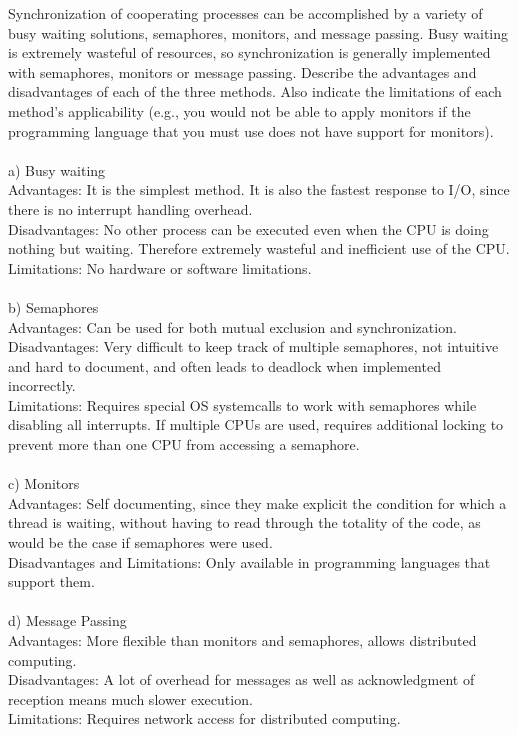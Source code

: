 \documentclass[12pt]{article}
\newenvironment{problem}[2][Problem]{\begin{trivlist}
\item[\hskip \labelsep {\bfseries #1}\hskip \labelsep {\bfseries #2.}]}{\end{trivlist}}
\begin{document}
\pagebreak
\begin{problem}{7}
Synchronization of cooperating processes can be accomplished by a variety of
busy waiting solutions, semaphores, monitors, and message passing. Busy waiting is extremely
wasteful of resources, so synchronization is generally implemented with semaphores, monitors
or message passing. Describe the advantages and disadvantages of each of the three methods.
Also indicate the limitations of each method's applicability (e.g., you would not be able to apply
monitors if the programming language that you must use does not have support for monitors).\\\\
a) Busy waiting\\
Advantages: It is the simplest method. It is also the fastest response to I/O, since there is no interrupt handling overhead.\\
Disadvantages: No other process can be executed even when the CPU is doing nothing but waiting. Therefore extremely wasteful and inefficient use of the CPU.\\
Limitations: No hardware or software limitations.\\\\
b) Semaphores\\
Advantages: Can be used for both mutual exclusion and synchronization. \\
Disadvantages: Very difficult to keep track of multiple semaphores, not intuitive and hard to document, and often leads to deadlock when implemented incorrectly.\\
Limitations: Requires special OS systemcalls to work with semaphores while disabling all interrupts. If multiple CPUs are used, requires additional locking to prevent more than one CPU from accessing a semaphore.\\\\
c) Monitors\\
Advantages: Self documenting, since they make explicit
the condition for which a thread is waiting, without having to read through the totality of the code, as would be the case if semaphores were used.\cite{cs4410}\\
Disadvantages and Limitations: Only available in programming languages that support them.\\\\
d) Message Passing\\
Advantages: More flexible than monitors and semaphores, allows distributed computing.\\
Disadvantages: A lot of overhead for messages as well as acknowledgment of reception means much slower execution.\\
Limitations: Requires network access for distributed computing.
\end{problem}
\pagebreak




 
\end{document}
